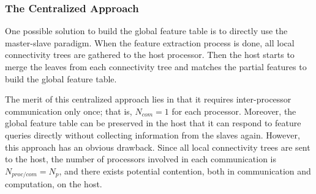 %

\subsubsection{The Centralized Approach}


One possible solution to build the global feature table is to directly use the master-slave paradigm. When the feature extraction process is done, all local connectivity trees are gathered to the host processor. Then the host starts to merge the leaves from each connectivity tree and matches the partial features to build the global feature table.

The merit of this centralized approach lies in that it requires inter-processor communication only once; that is, $N_{com} = 1$ for each processor. Moreover, the global feature table can be preserved in the host that it can respond to feature queries directly without collecting information from the slaves again. However, this approach has an obvious drawback. Since all local connectivity trees are sent to the host, the number of processors involved in each communication is $N_{proc/com} = N_p$, and there exists potential contention, both in communication and computation, on the host.

